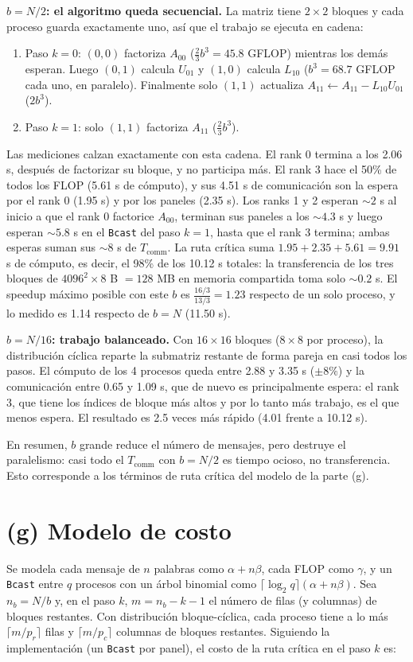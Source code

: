 \documentclass[11pt,a4paper]{article}
\newcommand{\Tcomm}{T_{\text{comm}}}
\begin{document}
\textbf{$b=N/2$: el algoritmo queda secuencial.} La matriz tiene $2\times2$ bloques y cada proceso guarda exactamente uno, así que el trabajo se ejecuta en cadena:
\begin{enumerate}
  \item Paso $k=0$: $(0,0)$ factoriza $A_{00}$ ($\tfrac{2}{3}b^3=45.8$ GFLOP) mientras los demás esperan. Luego $(0,1)$ calcula $U_{01}$ y $(1,0)$ calcula $L_{10}$ ($b^3=68.7$ GFLOP cada uno, en paralelo). Finalmente solo $(1,1)$ actualiza $A_{11}\leftarrow A_{11}-L_{10}U_{01}$ ($2b^3$).
  \item Paso $k=1$: solo $(1,1)$ factoriza $A_{11}$ ($\tfrac{2}{3}b^3$).
\end{enumerate}
Las mediciones calzan exactamente con esta cadena. El rank 0 termina a los 2.06 s, después de factorizar su bloque, y no participa más. El rank 3 hace el 50\% de todos los FLOP (5.61 s de cómputo), y sus 4.51 s de comunicación son la espera por el rank 0 (1.95 s) y por los paneles (2.35 s). Los ranks 1 y 2 esperan $\sim2$ s al inicio a que el rank 0 factorice $A_{00}$, terminan sus paneles a los $\sim4.3$ s y luego esperan $\sim5.8$ s en el \texttt{Bcast} del paso $k=1$, hasta que el rank 3 termina; ambas esperas suman sus $\sim8$ s de $\Tcomm$. La ruta crítica suma $1.95+2.35+5.61=9.91$ s de cómputo, es decir, el 98\% de los 10.12 s totales: la transferencia de los tres bloques de $4096^2\times8$ B $=128$ MB en memoria compartida toma solo $\sim0.2$ s. El speedup máximo posible con este $b$ es $\tfrac{16/3}{13/3}=1.23$ respecto de un solo proceso, y lo medido es 1.14 respecto de $b=N$ (11.50 s).

\textbf{$b=N/16$: trabajo balanceado.} Con $16\times16$ bloques ($8\times8$ por proceso), la distribución cíclica reparte la submatriz restante de forma pareja en casi todos los pasos. El cómputo de los 4 procesos queda entre 2.88 y 3.35 s ($\pm8\%$) y la comunicación entre 0.65 y 1.09 s, que de nuevo es principalmente espera: el rank 3, que tiene los índices de bloque más altos y por lo tanto más trabajo, es el que menos espera. El resultado es 2.5 veces más rápido (4.01 frente a 10.12 s).

En resumen, $b$ grande reduce el número de mensajes, pero destruye el paralelismo: casi todo el $\Tcomm$ con $b=N/2$ es tiempo ocioso, no transferencia. Esto corresponde a los términos de ruta crítica del modelo de la parte (g).

\section{(g) Modelo de costo}
Se modela cada mensaje de $n$ palabras como $\alpha+n\beta$, cada FLOP como $\gamma$, y un \texttt{Bcast} entre $q$ procesos con un árbol binomial como $\lceil\log_2 q\rceil(\alpha+n\beta)$. Sea $n_b=N/b$ y, en el paso $k$, $m=n_b-k-1$ el número de filas (y columnas) de bloques restantes. Con distribución bloque-cíclica, cada proceso tiene a lo más $\lceil m/p_r\rceil$ filas y $\lceil m/p_c\rceil$ columnas de bloques restantes. Siguiendo la implementación (un \texttt{Bcast} por panel), el costo de la ruta crítica en el paso $k$ es:
\end{document}
